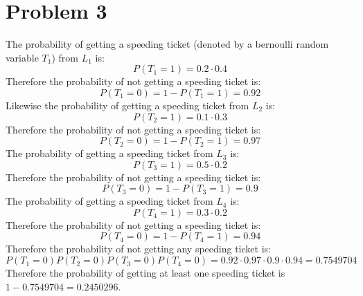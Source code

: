 \section*{Problem 3}
The probability of getting a speeding ticket (denoted by a bernoulli random variable $T_1$) from 
$L_1$ is:
$$P(T_1=1)=0.2\cdot0.4$$
Therefore the probability of not getting a speeding ticket is:
$$P(T_1=0)=1-P(T_1=1)=0.92$$
Likewise the probability of getting a speeding ticket from $L_2$ is:
$$P(T_2=1)=0.1\cdot0.3$$
Therefore the probability of not getting a speeding ticket is:
$$P(T_2=0)=1-P(T_2=1)=0.97$$
The probability of getting a speeding ticket from $L_3$ is:
$$P(T_3=1)=0.5\cdot0.2$$
Therefore the probability of not getting a speeding ticket is:
$$P(T_3=0)=1-P(T_3=1)=0.9$$
The probability of getting a speeding ticket from $L_4$ is:
$$P(T_4=1)=0.3\cdot0.2$$
Therefore the probability of not getting a speeding ticket is:
$$P(T_4=0)=1-P(T_4=1)=0.94$$
Therefore the probability of not getting any speeding ticket is:
$$P(T_1=0)P(T_2=0)P(T_3=0)P(T_4=0)=0.92\cdot0.97\cdot0.9\cdot0.94=0.7549704$$
Therefore the probability of getting at least one speeding ticket is $1-0.7549704=\boxed{0.2450296}$.


